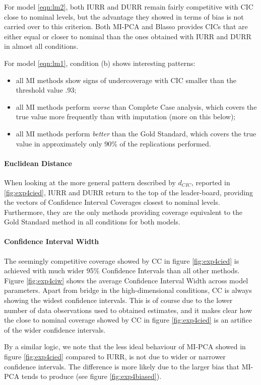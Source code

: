 	For model \ref{eqn:lm2}, both IURR and DURR remain fairly competitive with CIC close to nominal levels, but 
	the advantage they showed in terms of bias is not carried over to this criterion.
	Both MI-PCA and Blasso provides CICs that are either equal or closer to nominal than the ones obtained with
	IURR and DURR in almost all conditions.

	For model \ref{eqn:lm1}, condition (b) shows interesting patterns: 
	\begin{itemize}
		\item all MI methods show signs of undercoverage with CIC smaller than the threshold value .93;
		\item all MI methods perform \emph{worse} than Complete Case analysis, which covers the true value 
			more frequently than with imputation (more on this below);
		\item all MI methods perform \emph{better} than the Gold Standard, which covers the true value 
			in approximately only 90\% of the replications performed.
	\end{itemize}
	
	\paragraph{Euclidean Distance}
	When looking at the more general pattern described by $d_{CIC}$, reported in \ref{fig:exp4cied}, IURR and DURR 
	return to the top of the leader-board, providing the vectors of Confidence Interval Coverages closest to 
	nominal levels.
	Furthermore, they are the only methods providing coverage equivalent to the Gold Standard method in all conditions
	for both models.

	\paragraph{Confidence Interval Width}
	The seemingly competitive coverage showed by CC in figure \ref{fig:exp4cied} is achieved with much wider 
	95\% Confidence Intervals than all other methods. 
	Figure \ref{fig:exp4ciw} shows the average Confidence Interval Width across model parameters.
	Apart from bridge in the high-dimensional conditions, CC is always showing the widest confidence intervals.
	This is of course due to the lower number of data observations used to obtained estimates, and it makes clear
	how the close to nominal coverage showed by CC in figure \ref{fig:exp4cied} is an artifice of the wider 
	confidence intervals.

	By a similar logic, we note that the less ideal behaviour of MI-PCA showed in figure \ref{fig:exp4cied} compared 
	to IURR, is not due to wider or narrower confidence intervals.
	The difference is more likely due to the larger bias that MI-PCA tends to produce (see figure 
	\ref{fig:exp4biased}).

